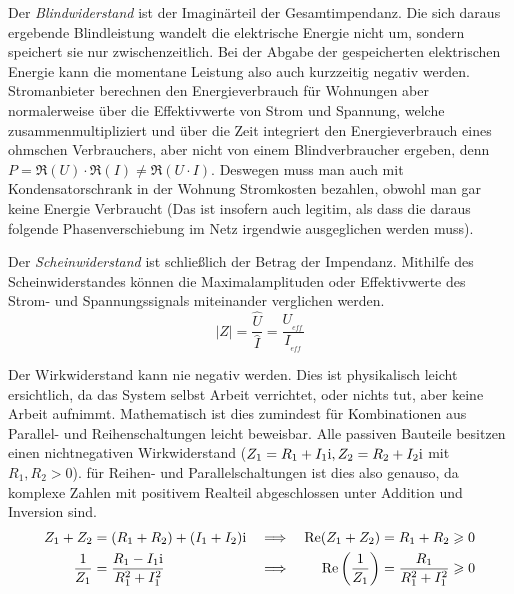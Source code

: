 Der \textit{Blindwiderstand} ist der Imaginärteil der Gesamtimpendanz. Die sich daraus 
ergebende Blindleistung wandelt die elektrische Energie nicht um, sondern speichert sie nur zwischenzeitlich. Bei der Abgabe der gespeicherten elektrischen Energie kann die momentane
Leistung also auch kurzzeitig negativ werden.
Stromanbieter berechnen den Energieverbrauch für Wohnungen aber normalerweise über die Effektivwerte von 
Strom und Spannung, welche zusammenmultipliziert und über die Zeit integriert den Energieverbrauch eines ohmschen Verbrauchers, aber nicht von einem Blindverbraucher ergeben, denn $P = \Re(U) \cdot \Re(I) \neq \Re(U \cdot I)$.
Deswegen muss man auch mit Kondensatorschrank in der Wohnung Stromkosten bezahlen, obwohl man gar keine Energie Verbraucht (Das ist insofern auch legitim, als dass die daraus folgende Phasenverschiebung im Netz irgendwie ausgeglichen werden muss).
%
%

Der \textit{Scheinwiderstand} ist schließlich der Betrag der Impendanz.
Mithilfe des Scheinwiderstandes können die Maximalamplituden oder Effektivwerte des Strom- und Spannungssignals miteinander verglichen werden.
$$|Z| = \frac{\hat{U}}{\hat{I}} = \frac{U__{eff}}{I__{eff}}$$

Der Wirkwiderstand kann nie negativ werden. Dies ist physikalisch leicht ersichtlich, da das System selbst Arbeit verrichtet, oder nichts tut, aber keine Arbeit aufnimmt. Mathematisch ist dies zumindest für Kombinationen aus Parallel- und Reihenschaltungen leicht beweisbar. Alle passiven Bauteile besitzen einen nichtnegativen Wirkwiderstand ($Z_1=R_1+I_1\mathrm{i}, Z_2=R_2+I_2\mathrm{i}$ mit $R_1, R_2 > 0$). für Reihen- und Parallelschaltungen ist dies also genauso, da komplexe Zahlen mit positivem Realteil abgeschlossen unter Addition und Inversion sind.
\begin{align*}
    Z_1 + Z_2 &= (R_1+R_2) + (I_1 + I_2)\mathrm{i} 
    &\implies&& \Re(Z_1 + Z_2) &= R_1+R_2 \geqslant 0\\
    \frac{1}{Z_1} &= \frac{R_1-I_1\mathrm{i}}{R_1^2 + I_1^2}
    &\implies&& \Re\qty(\frac{1}{Z_1}) &= \frac{R_1}{R_1^2 + I_1^2} \geqslant 0
\end{align*}